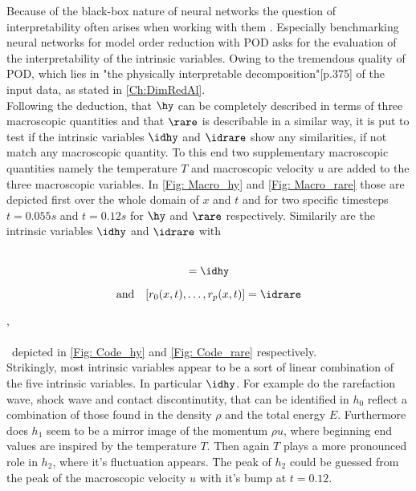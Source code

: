 Because of the black-box nature of neural networks the question of interpretability often arises when working with them \cite{fan2021interpretability}. Especially benchmarking neural networks for model order reduction with POD asks for the evaluation of the interpretability of the intrinsic variables. Owing to the tremendous quality of POD, which lies in "the physically interpretable decomposition"\cite{Kutz}[p.375] of the input data, as stated in \cref{Ch:DimRedAl}.\\
Following the deduction, that \(\hy\) can be completely described in terms of three macroscopic quantities and that \(\rare\) is describable in a similar way, it is put to test if the intrinsic variables \(\idhy\) and \(\idrare\) show any similarities, if not match any macroscopic quantity. To this end two supplementary macroscopic quantities namely the temperature \(T\) and macroscopic velocity \(u\) are added to the three macroscopic variables. In \cref{Fig: Macro_hy} and \cref{Fig: Macro_rare} those are depicted first over the whole domain of \(x\) and \(t\) and for two specific timesteps \(t=0.055s\) and \(t=0.12s\) for \(\hy\) and \(\rare\) respectively. Similarily are the intrinsic variables \(\idhy\) and \(\idrare\) with\\\\
\begin{minipage}{0.45\textwidth}
	\begin{equation}
		[h_0(x,t),\dots,h_p(x,t)] = \idhy
	\end{equation}
\end{minipage}%
\begin{minipage}{0.45\textwidth}
	\begin{equation}
		\mathrm{and}\quad[r_0(x,t),\dots,r_p(x,t)] = \idrare
	\end{equation}
\end{minipage},\\\\\
depicted in \cref{Fig: Code_hy} and \cref{Fig: Code_rare} respectively.\\
Strikingly, most intrinsic variables appear to be a sort of linear combination of the five intrinsic variables. In particular \(\idhy\). For example do the rarefaction wave, shock wave and contact discontinutity, that can be identified in \(h_0\) reflect a combination of those found in the density \(\rho\) and the total energy \(E\). Furthermore does \(h_1\) seem to be a mirror image of the momentum \(\rho u\), where beginning end values are inspired by the temperature \(T\). Then again \(T\) plays a more pronounced role in \(h_2\), where it's fluctuation appears. The peak of \(h_2\) could be guessed from the peak of the macroscopic velocity \(u\) with it's bump at \(t=0.12\).\\
